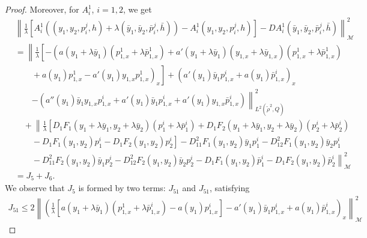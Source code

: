 \documentclass[10pt,a4paper]{amsart}
\begin{document}
\begin{proof}
    \noindent Moreover, for $A^1_i$, $i=1,2$, we get
    \begin{equation}
    	\begin{split}
    		&\left\| \frac{1}{\lambda}\left[ A^1_i (( y_1, y_2, p_i^j, h)+\lambda(\bar y_1,\bar y_2,\bar p_i^j,\bar h)) - A^1_i( y_1, y_2, p_i^j, h) \right] - D A^1_i(\bar y_1,\bar y_2,\bar p_i^j,\bar h) \right\|^{2}_{\mathcal{M}} \\
            &= \left\| \frac{1}{\lambda} \left[ 
            - \left(a(y_1+\lambda\bar y_1)(p_{1,x}^1 + \lambda \bar p_{1,x}^1) + a'(y_1+\lambda\bar y_1)(y_{1,x}+\lambda\bar y_{1,x})(p_{1,x}^1+\lambda\bar p_{1,x}^1) \right.\right.\right. \\
            &\left.\left.\left. \qquad + a(y_1)p_{1,x}^1 - a'(y_1)y_{1,x}p_{1,x}^1 \right)_x \right] + \left(a'(y_{1})\bar y_{1} p^i_{1,x} + a(y_{1}) \bar p^i_{1,x}\right)_x \right.\\
            &\qquad \left. - \left( a''(y_{1})\bar y_{1} y_{1,x} p^i_{1,x} + a'(y_{1})\bar y_{1}  p^i_{1,x} + a'(y_1)y_{1,x} \bar p^i_{1,x} \right)
            \right\|_{L^2(\tilde\rho^2,Q)}^2 \\
            &\quad + \left\| \frac{1}{\lambda} \left[ D_1 F_1(y_1+\lambda \bar y_1,y_2+\lambda \bar y_2) (p^i_1 +\lambda \bar p^i_1) + D_1 F_2(y_1+\lambda \bar y_1,y_2+\lambda \bar y_2) (p^i_2 +\lambda \bar p^i_2) \right.\right. \\
            &\left.\left.\qquad - D_1 F_1(y_1,y_2) p^i_1 - D_1 F_2(y_1,y_2) p^i_2 \right] - D_{11}^2 F_1(y_1,y_2)\bar y_1 p^i_1 - D_{12}^2 F_1(y_1,y_2)\bar y_2 p^i_1 \right. \\
            &\left.\qquad - D_{11}^2 F_2(y_1,y_2)\bar y_1 p^i_2 - D_{12}^2 F_2(y_1,y_2)\bar y_2 p^i_2 
            - D_1 F_1(y_1,y_2) \bar p^i_1 - D_1 F_2(y_1,y_2) \bar p^i_2
            \right\|^{2}_{\mathcal{M}} \\
            &= J_5+J_6.
    	\end{split}
    \end{equation}We observe that  $J_5$  is formed by two terms: $J_{51}$ and $J_{51}$, satisfying
    \begin{equation*}
        \begin{split}
            J_{51} \leq 2\left\| \left( \frac{1}{\lambda} \left[ a(y_1+\lambda\bar y_1)(p^1_{1,x}+\lambda\bar p^i_{1,x} ) - a(y_1)p^i_{1,x} \right] - a'(y_1)\bar y_1 p^i_{1,x} + a(y_1)\bar p^i_{1,x} \right)_x\right\|^{2}_{\mathcal{M}}

\end{split}
\end{equation*}
\end{proof}
\end{document}
